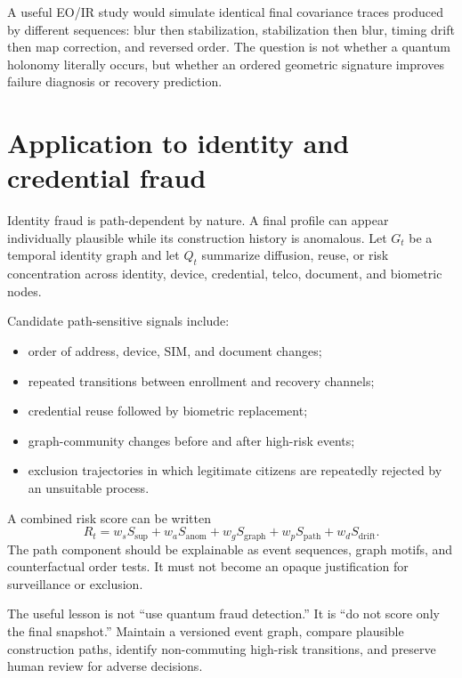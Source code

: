 A useful EO/IR study would simulate identical final covariance traces produced by different sequences: blur then stabilization, stabilization then blur, timing drift then map correction, and reversed order. The question is not whether a quantum holonomy literally occurs, but whether an ordered geometric signature improves failure diagnosis or recovery prediction.

\section{Application to identity and credential fraud}

Identity fraud is path-dependent by nature. A final profile can appear individually plausible while its construction history is anomalous. Let $G_t$ be a temporal identity graph and let $Q_t$ summarize diffusion, reuse, or risk concentration across identity, device, credential, telco, document, and biometric nodes.

Candidate path-sensitive signals include:

\begin{itemize}
  \item order of address, device, SIM, and document changes;
  \item repeated transitions between enrollment and recovery channels;
  \item credential reuse followed by biometric replacement;
  \item graph-community changes before and after high-risk events;
  \item exclusion trajectories in which legitimate citizens are repeatedly rejected by an unsuitable process.
\end{itemize}

A combined risk score can be written
\[
R_t=w_sS_{\mathrm{sup}}+w_aS_{\mathrm{anom}}+w_gS_{\mathrm{graph}}+w_pS_{\mathrm{path}}+w_dS_{\mathrm{drift}}.
\]
The path component should be explainable as event sequences, graph motifs, and counterfactual order tests. It must not become an opaque justification for surveillance or exclusion.

\begin{engineerbox}
The useful lesson is not ``use quantum fraud detection.'' It is ``do not score only the final snapshot.'' Maintain a versioned event graph, compare plausible construction paths, identify non-commuting high-risk transitions, and preserve human review for adverse decisions.
\end{engineerbox}


